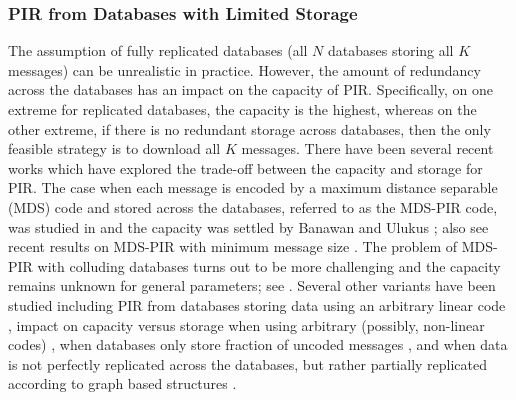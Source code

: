 \subsubsection{PIR from Databases with Limited Storage}
The assumption of fully replicated databases (all $N$ databases storing all $K$ messages) can be unrealistic in practice. However, the amount of redundancy across the databases has an impact on the capacity of PIR. Specifically, on one extreme for replicated databases, the capacity is the highest, whereas on the other extreme, if there is no redundant storage across databases, then the only feasible strategy is to download all $K$ messages. There have been several recent works which have explored the trade-off between the capacity and storage for PIR. The case when each message is encoded by a maximum distance separable (MDS) code and stored across the databases, referred to as the MDS-PIR code, was studied in \cite{PIR_coded, Tajeddine_Rouayheb} and the capacity was settled by Banawan and Ulukus \cite{PIR_coded}; also see recent results on MDS-PIR with minimum message size \cite{zhou2020capacity}. The problem of MDS-PIR with colluding databases turns out to be more challenging  and the capacity remains unknown for general parameters; see \cite{FREIJ_HOLLANTI, Sun_Jafar_MDSTPIR}. Several other variants have been studied including PIR from databases storing data using an arbitrary linear code \cite{kumar2019achieving, Lin_Kumar_Rosnes_Amat}, impact on capacity versus storage when using arbitrary (possibly, non-linear codes) \cite{guo_ruida_tian_storage_PIR_2021, efficient_storage_ITW2019, tian_2019_storage_cost_journal,tian2018shannon,sun2019breaking}, when databases only store fraction of uncoded messages \cite{attia2018capacity, HeteroPIR, PIR_decentralized}, and when data is not perfectly replicated across the databases, but rather partially replicated according to graph based structures \cite{raviv2019GPIR, Karim_nonreplicated, Jia_Jafar_GXSTPIR,Sadeh_Gu_Tamo}.

